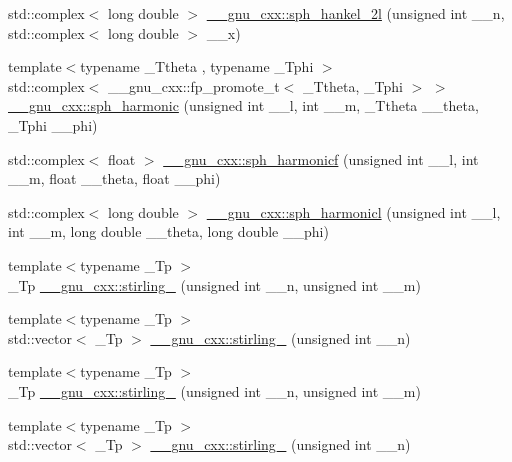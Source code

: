 \begin{DoxyCompactItemize}
\item 
std\+::complex$<$ long double $>$ \hyperlink{group__mathsf__gnu_ga3d9d9aaceba455a5ddc79d178ee1cb6d}{\+\_\+\+\_\+gnu\+\_\+cxx\+::sph\+\_\+hankel\+\_\+2l} (unsigned int \+\_\+\+\_\+n, std\+::complex$<$ long double $>$ \+\_\+\+\_\+x)
\item 
{\footnotesize template$<$typename \+\_\+\+Ttheta , typename \+\_\+\+Tphi $>$ }\\std\+::complex$<$ \+\_\+\+\_\+gnu\+\_\+cxx\+::fp\+\_\+promote\+\_\+t$<$ \+\_\+\+Ttheta, \+\_\+\+Tphi $>$ $>$ \hyperlink{group__mathsf__gnu_gacbff28988d5d36f0c3b3fe03d4f57896}{\+\_\+\+\_\+gnu\+\_\+cxx\+::sph\+\_\+harmonic} (unsigned int \+\_\+\+\_\+l, int \+\_\+\+\_\+m, \+\_\+\+Ttheta \+\_\+\+\_\+theta, \+\_\+\+Tphi \+\_\+\+\_\+phi)
\item 
std\+::complex$<$ float $>$ \hyperlink{group__mathsf__gnu_ga062b1156f5646fe42719439bb3dcc9e5}{\+\_\+\+\_\+gnu\+\_\+cxx\+::sph\+\_\+harmonicf} (unsigned int \+\_\+\+\_\+l, int \+\_\+\+\_\+m, float \+\_\+\+\_\+theta, float \+\_\+\+\_\+phi)
\item 
std\+::complex$<$ long double $>$ \hyperlink{group__mathsf__gnu_ga414c8374b4579aa14e38f5401304b6fa}{\+\_\+\+\_\+gnu\+\_\+cxx\+::sph\+\_\+harmonicl} (unsigned int \+\_\+\+\_\+l, int \+\_\+\+\_\+m, long double \+\_\+\+\_\+theta, long double \+\_\+\+\_\+phi)
\item 
{\footnotesize template$<$typename \+\_\+\+Tp $>$ }\\\+\_\+\+Tp \hyperlink{group__mathsf__gnu_ga2b955dac7d2c5125f2091eaeb25c8ad2}{\+\_\+\+\_\+gnu\+\_\+cxx\+::stirling\+\_} (unsigned int \+\_\+\+\_\+n, unsigned int \+\_\+\+\_\+m)
\item 
{\footnotesize template$<$typename \+\_\+\+Tp $>$ }\\std\+::vector$<$ \+\_\+\+Tp $>$ \hyperlink{group__mathsf__gnu_gaff3d42b2ec5364d24c1ad0ef4b374a8d}{\+\_\+\+\_\+gnu\+\_\+cxx\+::stirling\+\_} (unsigned int \+\_\+\+\_\+n)
\item 
{\footnotesize template$<$typename \+\_\+\+Tp $>$ }\\\+\_\+\+Tp \hyperlink{group__mathsf__gnu_ga3761c0e467cbe45cbda66a4e796adcd3}{\+\_\+\+\_\+gnu\+\_\+cxx\+::stirling\+\_} (unsigned int \+\_\+\+\_\+n, unsigned int \+\_\+\+\_\+m)
\item 
{\footnotesize template$<$typename \+\_\+\+Tp $>$ }\\std\+::vector$<$ \+\_\+\+Tp $>$ \hyperlink{group__mathsf__gnu_ga6a2386b3e0940935f10a163baa925656}{\+\_\+\+\_\+gnu\+\_\+cxx\+::stirling\+\_} (unsigned int \+\_\+\+\_\+n)

\end{DoxyCompactItemize}

